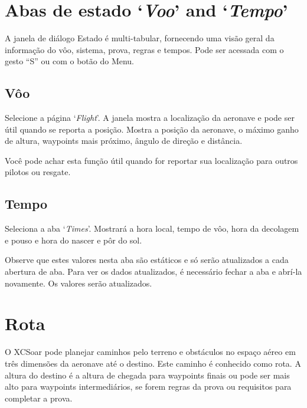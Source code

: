 \section{Abas de estado `{\it Voo}' and `{\it Tempo}'}\label{sec:flight-status}

A janela de diálogo Estado é multi-tabular, fornecendo uma visão geral da informação do vôo, sistema, prova, regras e tempos.  Pode ser acessada com o gesto “S” ou com o botão do Menu. 
\begin{quote}
\blink{}
\end{quote}

\subsection*{Vôo}
Selecione a página `{\it Flight}'. 
A janela mostra a localização da aeronave e pode ser útil quando se reporta a posição.  Mostra a posição da aeronave, o máximo ganho de altura, waypoints mais próximo, ângulo de direção e distância.

Você pode achar esta função útil quando for reportar sua localização para outros pilotos ou resgate.

\subsection*{Tempo}\label{sec:time-status}
Seleciona a aba  `{\it Times}'. 
Mostrará a hora local, tempo de vôo, hora da decolagem e pouso e hora do nascer e pôr do sol.

Observe que estes valores nesta aba são estáticos e só serão atualizados a cada abertura de aba. 
Para ver os dados atualizados, é necessário fechar a aba e abrí-la novamente.  Os valores serão atualizados. 


\section{Rota}\label{sec:route}

O XCSoar pode planejar caminhos pelo terreno e obstáculos no espaço aéreo em três dimensões da aeronave até o destino.  Este caminho é conhecido como rota.  A altura do destino é a altura de chegada para waypoints finais ou pode ser mais alto para waypoints intermediários, se forem regras da prova ou requisitos para completar a prova.  

